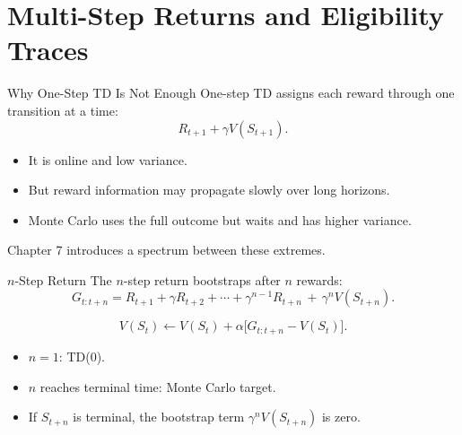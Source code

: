 \documentclass[aspectratio=169]{beamer}
\begin{document}
\section{Multi-Step Returns and Eligibility Traces}

\begin{frame}{Why One-Step TD Is Not Enough}
\small
One-step TD assigns each reward through one transition at a time:
\[
R_{t+1}+\gamma V(S_{t+1}).
\]

\vspace{0.7em}
\begin{itemize}
    \item It is online and low variance.
    \item But reward information may propagate slowly over long horizons.
    \item Monte Carlo uses the full outcome but waits and has higher variance.
\end{itemize}

\vspace{0.7em}
Chapter 7 introduces a spectrum between these extremes.
\end{frame}

\begin{frame}{$n$-Step Return}
\small
The $n$-step return bootstraps after $n$ rewards:
\[
G_{t:t+n}=
R_{t+1}+\gamma R_{t+2}+\cdots+\gamma^{n-1}R_{t+n}
\,+\,\gamma^n V(S_{t+n}).
\]

\vspace{0.7em}
\[
V(S_t)\leftarrow V(S_t)+\alpha\bigl[G_{t:t+n}-V(S_t)\bigr].
\]

\vspace{0.6em}
\begin{itemize}
    \item $n=1$: TD(0).
    \item $n$ reaches terminal time: Monte Carlo target.
    \item If $S_{t+n}$ is terminal, the bootstrap term $\gamma^n V(S_{t+n})$ is zero.
\end{itemize}
\end{frame}
\end{document}
